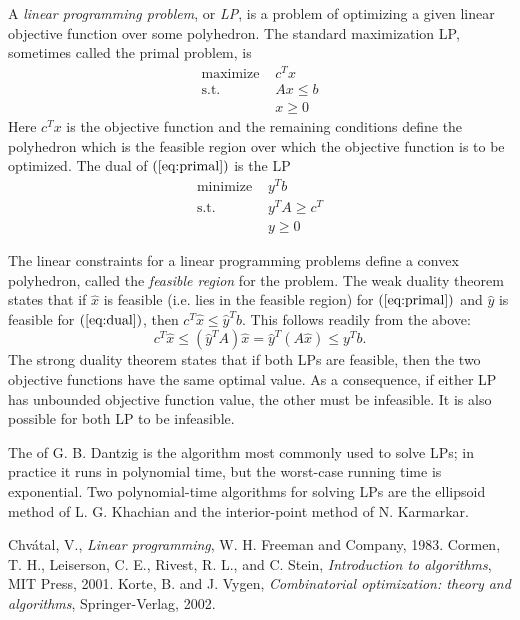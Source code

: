 \documentclass[12pt]{article}
\begin{document}
A \emph{linear programming problem}, or \emph{LP}, 
is a problem of optimizing a given
linear objective function over some polyhedron.  The standard
maximization LP, sometimes called the
primal problem, is
\begin{align*}
\text{maximize\ }   & c^Tx\  \\
\text{s.t.\ }       & Ax\le b\tag{P}\label{eq:primal} \\
                    &  x\ge 0
\end{align*}
Here $c^Tx$ is the objective function and the remaining conditions
define the polyhedron which is the feasible region over which the
objective function is to be optimized.  The dual of
$({\ref{eq:primal}})$ is the LP
\begin{align*}
\text{minimize\ }  & y^Tb\ \\
\text{s.t.\ }      & y^TA\ge c^T\tag{D}\label{eq:dual} \\
                   &    y\ge 0
\end{align*}

The linear constraints for a linear programming problems define a convex polyhedron, called the \emph{feasible region} for the problem.  The weak duality theorem states that if $\hat{x}$ is feasible (i.e. lies in the feasible region) for
$(\ref{eq:primal})$ and $\hat{y}$ is feasible for $(\ref{eq:dual})$,
then $c^T\hat{x}\le\hat{y}^Tb$.  This follows readily from the above:
\[c^T\hat{x}\le(\hat{y}^TA)\hat{x}=\hat{y}^T(A\hat{x})\le y^Tb.\]
The strong duality theorem states that if both LPs are feasible,
then the two objective functions have the same optimal value.  As a
consequence, if
either LP has unbounded objective function value, the other must
be infeasible.  It is also possible for both LP to be infeasible.

The  of G. B. Dantzig is 
the algorithm
most commonly used to solve LPs; in practice it runs in polynomial time,
but the worst-case running time is exponential.  Two polynomial-time
algorithms for solving LPs are the ellipsoid method of L. G. Khachian
and the interior-point method of N. Karmarkar.

\begin{thebibliography}{3}
Chv\'{a}tal, V.,  \emph{Linear programming}, W. H. Freeman and Company, 1983.
Cormen, T. H., Leiserson, C. E., Rivest, R. L., and C. Stein,
\emph{Introduction to algorithms}, MIT Press, 2001.
Korte, B. and J. Vygen,  \emph{Combinatorial optimization: theory and
algorithms}, Springer-Verlag, 2002.
\end{thebibliography}
\end{document}
